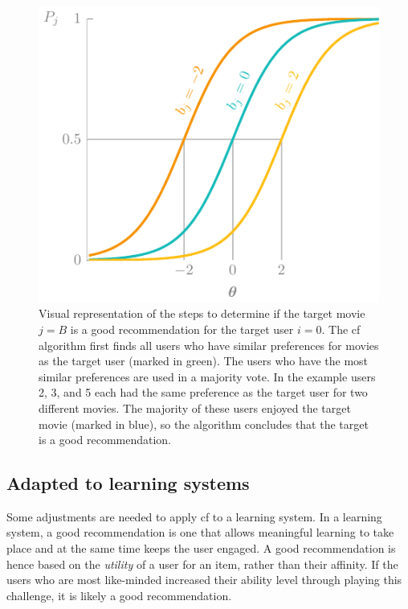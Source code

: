 \begin{figure}
    \centering
    \includegraphics[page=7,width=\textwidth]{03-education/figures/tikzfigures.pdf}
    \caption[Collaborative filtering algorithm]{Visual representation of the steps to determine if the target movie $j=B$ is a good recommendation for the target user $i=0$. 
    The \gls{cf} algorithm first finds all users who have similar preferences for movies as the target user (marked in green). 
    The users who have the most similar preferences are used in a majority vote. 
    In the example users 2, 3, and 5 each had the same preference as the target user for two different movies.
    The majority of these users enjoyed the target movie (marked in blue), so the algorithm concludes that the target is a good recommendation.}
    \label{fig:cf}
\end{figure}

\subsection{Adapted to learning systems}
\label{sec:adapted-cf}
Some adjustments are needed to apply \gls{cf} to a learning system.
In a learning system, a good recommendation is one that allows meaningful learning to take place and at the same time keeps the user engaged.
A good recommendation is hence based on the \textit{utility} of a user for an item, rather than their affinity.
If the users who are most like-minded increased their ability level through playing this challenge, it is likely a good recommendation.

